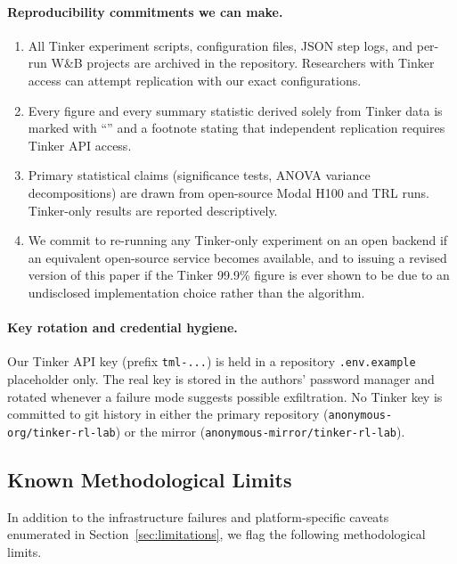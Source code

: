 \paragraph{Reproducibility commitments we can make.}
\begin{enumerate}
  \item All Tinker experiment scripts, configuration files, JSON step
        logs, and per-run W\&B projects are archived in the repository.
        Researchers with Tinker access can attempt replication with our
        exact configurations.
  \item Every figure and every summary statistic derived solely from
        Tinker data is marked with ``\dag'' and a footnote stating that
        independent replication requires Tinker API access.
  \item Primary statistical claims (significance tests, ANOVA variance
        decompositions) are drawn from open-source Modal H100 and TRL
        runs. Tinker-only results are reported descriptively.
  \item We commit to re-running any Tinker-only experiment on an open
        backend if an equivalent open-source service becomes available,
        and to issuing a revised version of this paper if the Tinker
        99.9\% figure is ever shown to be due to an undisclosed
        implementation choice rather than the algorithm.
\end{enumerate}

\paragraph{Key rotation and credential hygiene.}
Our Tinker API key (prefix \texttt{tml-...}) is held in a repository
\texttt{.env.example} placeholder only. The real key is stored in the
authors' password manager and rotated whenever a failure mode suggests
possible exfiltration. No Tinker key is committed to git history in
either the primary repository (\texttt{anonymous-org/tinker-rl-lab}) or
the mirror (\texttt{anonymous-mirror/tinker-rl-lab}).

\subsection{Known Methodological Limits}
\label{sec:methodlimits}

In addition to the infrastructure failures and platform-specific caveats
enumerated in Section~\ref{sec:limitations}, we flag the following
methodological limits.


